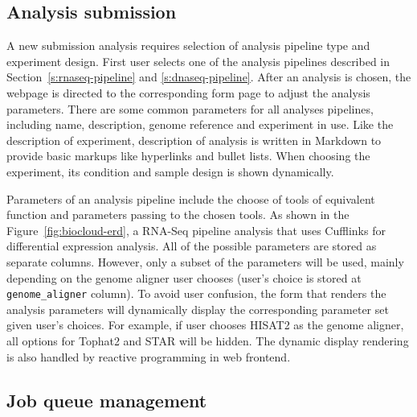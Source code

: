 \subsection{Analysis submission}

A new submission analysis requires selection of analysis pipeline type and
experiment design. First user selects one of the analysis pipelines described
in Section~\ref{s:rnaseq-pipeline} and \ref{s:dnaseq-pipeline}. After an
analysis is chosen, the webpage is directed to the corresponding form page to
adjust the analysis parameters. There are some common parameters for all
analyses pipelines, including name, description, genome reference and
experiment in use. Like the description of experiment, description of analysis
is written in Markdown to provide basic markups like hyperlinks and bullet
lists. When choosing the experiment, its condition and sample design is shown
dynamically.

Parameters of an analysis pipeline include the choose of tools of equivalent
function and parameters passing to the chosen tools. As shown in the
Figure~\ref{fig:biocloud-erd}, a RNA-Seq pipeline analysis that uses Cufflinks
for differential expression analysis. All of the possible parameters are
stored as separate columns. However, only a subset of the parameters will be
used, mainly depending on the genome aligner user chooses (user's choice is stored
at \texttt{genome\_aligner} column). To avoid user confusion, the form that
renders the analysis parameters will dynamically display the corresponding
parameter set given user's choices. For example, if user chooses HISAT2 as the
genome aligner, all options for Tophat2 and STAR will be hidden. The dynamic
display rendering is also handled by reactive programming in web frontend.


\subsection{Job queue management}


